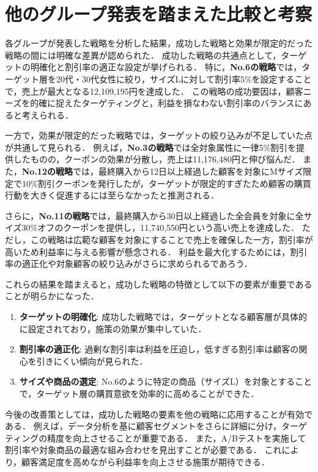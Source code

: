 \documentclass[titlepage,a4paper]{jsarticle}
\begin{document}
\section{他のグループ発表を踏まえた比較と考察}

各グループが発表した戦略を分析した結果，成功した戦略と効果が限定的だった戦略の間には明確な差異が認められた．
成功した戦略の共通点として，ターゲットの明確化と割引率の適正な設定が挙げられる．
特に，\textbf{No.6の戦略}では，ターゲット層を20代・30代女性に絞り，サイズLに対して割引率5\%を設定することで，売上が最大となる12,109,195円を達成した．
この戦略の成功要因は，顧客ニーズを的確に捉えたターゲティングと，利益を損なわない割引率のバランスにあると考えられる．

一方で，効果が限定的だった戦略では，ターゲットの絞り込みが不足していた点が共通して見られる．
例えば，\textbf{No.3の戦略}では全対象属性に一律5\%割引を提供したものの，クーポンの効果が分散し，売上は11,176,480円と伸び悩んだ．
また，\textbf{No.12の戦略}では，最終購入から12日以上経過した顧客を対象にMサイズ限定で10\%割引クーポンを発行したが，ターゲットが限定的すぎたため顧客の購買行動を大きく促進するには至らなかったと推測される．

さらに，\textbf{No.11の戦略}では，最終購入から30日以上経過した全会員を対象に全サイズ30\%オフのクーポンを提供し，11,740,550円という高い売上を達成した．
ただし，この戦略は広範な顧客を対象にすることで売上を確保した一方，割引率が高いため利益率に与える影響が懸念される．
利益を最大化するためには，割引率の適正化や対象顧客の絞り込みがさらに求められるであろう．

これらの結果を踏まえると，成功した戦略の特徴として以下の要素が重要であることが明らかになった．
\begin{enumerate}
  \item \textbf{ターゲットの明確化}: 成功した戦略では，ターゲットとなる顧客層が具体的に設定されており，施策の効果が集中していた．
  \item \textbf{割引率の適正化}: 過剰な割引率は利益を圧迫し，低すぎる割引率は顧客の関心を引きにくい傾向が見られた．
  \item \textbf{サイズや商品の選定}: No.6のように特定の商品（サイズL）を対象とすることで，ターゲット層の購買意欲を効率的に高めることができた．
\end{enumerate}

今後の改善策としては，成功した戦略の要素を他の戦略に応用することが有効である．
例えば，データ分析を基に顧客セグメントをさらに詳細に分け，ターゲティングの精度を向上させることが重要である．
また，A/Bテストを実施して割引率や対象商品の最適な組み合わせを見出すことが必要である．
これにより，顧客満足度を高めながら利益率を向上させる施策が期待できる．
\end{document}
